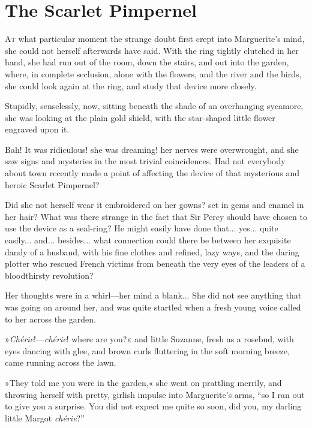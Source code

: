 
\chapter{The Scarlet Pimpernel}
\lettrine[lines=4]{A}{t} what particular moment the strange doubt first crept into Marguerite's mind, she could not herself afterwards have said. With the ring tightly clutched in her hand, she had run out of the room, down the stairs, and out into the garden, where, in complete seclusion, alone with the flowers, and the river and the birds, she could look again at the ring, and study that device more closely.

Stupidly, senselessly, now, sitting beneath the shade of an overhanging sycamore, she was looking at the plain gold shield, with the star-shaped little flower engraved upon it.

Bah! It was ridiculous! she was dreaming! her nerves were overwrought, and she saw signs and mysteries in the most trivial coincidences. Had not everybody about town recently made a point of affecting the device of that mysterious and heroic Scarlet Pimpernel?

Did she not herself wear it embroidered on her gowns? set in gems and enamel in her hair? What was there strange in the fact that Sir Percy should have chosen to use the device as a seal-ring? He might easily have done that... yes... quite easily... and... besides... what connection could there be between her exquisite dandy of a husband, with his fine clothes and refined, lazy ways, and the daring plotter who rescued French victims from beneath the very eyes of the leaders of a bloodthirsty revolution?

Her thoughts were in a whirl\allowbreak---\allowbreak her mind a blank... She did not see anything that was going on around her, and was quite startled when a fresh young voice called to her across the garden.

»\textit{Chérie}!\allowbreak---\allowbreak \textit{chérie}! where are you?« and little Suzanne, fresh as a rosebud, with eyes dancing with glee, and brown curls fluttering in the soft morning breeze, came running across the lawn.

»They told me you were in the garden,« she went on prattling merrily, and throwing herself with pretty, girlish impulse into Marguerite's arms, \enquote{so I ran out to give you a surprise. You did not expect me quite so soon, did you, my darling little Margot \textit{chérie}?}

